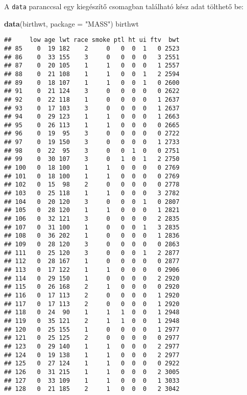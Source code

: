 \documentclass[
]{book}
\newenvironment{Shaded}{\begin{snugshade}}{\end{snugshade}}
\newcommand{\DataTypeTok}[1]{\textcolor[rgb]{0.13,0.29,0.53}{#1}}
\newcommand{\KeywordTok}[1]{\textcolor[rgb]{0.13,0.29,0.53}{\textbf{#1}}}
\newcommand{\NormalTok}[1]{#1}
\newcommand{\StringTok}[1]{\textcolor[rgb]{0.31,0.60,0.02}{#1}}
\begin{document}
A \texttt{data} paranccsal egy kiegészítő csomagban található kész adat tölthető be:

\begin{Shaded}
\begin{Highlighting}[]
\KeywordTok{data}\NormalTok{(birthwt, }\DataTypeTok{package =} \StringTok{"MASS"}\NormalTok{)}
\NormalTok{birthwt}
\end{Highlighting}
\end{Shaded}

\begin{verbatim}
##     low age lwt race smoke ptl ht ui ftv  bwt
## 85    0  19 182    2     0   0  0  1   0 2523
## 86    0  33 155    3     0   0  0  0   3 2551
## 87    0  20 105    1     1   0  0  0   1 2557
## 88    0  21 108    1     1   0  0  1   2 2594
## 89    0  18 107    1     1   0  0  1   0 2600
## 91    0  21 124    3     0   0  0  0   0 2622
## 92    0  22 118    1     0   0  0  0   1 2637
## 93    0  17 103    3     0   0  0  0   1 2637
## 94    0  29 123    1     1   0  0  0   1 2663
## 95    0  26 113    1     1   0  0  0   0 2665
## 96    0  19  95    3     0   0  0  0   0 2722
## 97    0  19 150    3     0   0  0  0   1 2733
## 98    0  22  95    3     0   0  1  0   0 2751
## 99    0  30 107    3     0   1  0  1   2 2750
## 100   0  18 100    1     1   0  0  0   0 2769
## 101   0  18 100    1     1   0  0  0   0 2769
## 102   0  15  98    2     0   0  0  0   0 2778
## 103   0  25 118    1     1   0  0  0   3 2782
## 104   0  20 120    3     0   0  0  1   0 2807
## 105   0  28 120    1     1   0  0  0   1 2821
## 106   0  32 121    3     0   0  0  0   2 2835
## 107   0  31 100    1     0   0  0  1   3 2835
## 108   0  36 202    1     0   0  0  0   1 2836
## 109   0  28 120    3     0   0  0  0   0 2863
## 111   0  25 120    3     0   0  0  1   2 2877
## 112   0  28 167    1     0   0  0  0   0 2877
## 113   0  17 122    1     1   0  0  0   0 2906
## 114   0  29 150    1     0   0  0  0   2 2920
## 115   0  26 168    2     1   0  0  0   0 2920
## 116   0  17 113    2     0   0  0  0   1 2920
## 117   0  17 113    2     0   0  0  0   1 2920
## 118   0  24  90    1     1   1  0  0   1 2948
## 119   0  35 121    2     1   1  0  0   1 2948
## 120   0  25 155    1     0   0  0  0   1 2977
## 121   0  25 125    2     0   0  0  0   0 2977
## 123   0  29 140    1     1   0  0  0   2 2977
## 124   0  19 138    1     1   0  0  0   2 2977
## 125   0  27 124    1     1   0  0  0   0 2922
## 126   0  31 215    1     1   0  0  0   2 3005
## 127   0  33 109    1     1   0  0  0   1 3033
## 128   0  21 185    2     1   0  0  0   2 3042

\end{verbatim}
\end{document}
